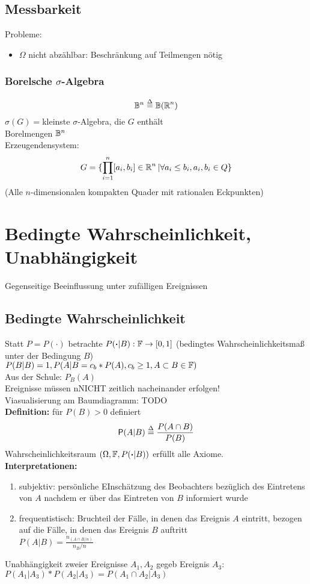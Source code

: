 \documentclass[german]{latex4ei/latex4ei_sheet}
\begin{document}
\subsection{Messbarkeit}
Probleme:
\begin{itemize}
	\item $\Omega$ nicht abz\"ahlbar: Beschr\"ankung auf Teilmengen n\"otig
\end{itemize}
\subsubsection{Borelsche $\sigma$-Algebra}
\[\B^n \overset{\Delta}{=} \B(\R^n)\]
$\sigma(G)=$kleinste $\sigma$-Algebra, die $G$ enth\"alt\\
Borelmengen $\B^n$\\
Erzeugendensystem:\\
\[G=\{\prod_{i=1}^n [a_i,b_i] \in \R^n | \forall a_i\le b_i , a_i,b_i \in Q\}\]
(Alle $n$-dimensionalen kompakten Quader mit rationalen Eckpunkten)
\section{Bedingte Wahrscheinlichkeit, Unabh\"angigkeit}
Gegenseitige Beeinflussung unter zuf\"alligen Ereignissen
\subsection{Bedingte Wahrscheinlichkeit}
Statt $P=P(\boldsymbol{\cdot})$ betrachte $P(\boldsymbol{\cdot}|B): \F \to [0,1]$ (bedingtes Wahrscheinlichkeitsma\ss{} unter der Bedingung $B$)\\
$P(B|B)=1, P(A|B=c_b*P(A), c_b\ge 1, A \subset B \in \F)$\\
Aus der Schule: $P_B(A)$\\
Ereignisse m\"ussen nNICHT zeitlich nacheinander erfolgen!\\
Viasualisierung am Baumdiagramm: TODO\\
\textbf{Definition:} f\"ur $P(B)>0$ definiert\\
\[\P(A|B)\overset{\Delta}{=}\frac{P(A \cap B)}{P(B)}\]
Wahrscheinlichkeitsraum $(\Omega, \F, P(\boldsymbol{\cdot}| B))$ erf\"ullt alle Axiome.\\
\textbf{Interpretationen:}
\begin{enumerate}
	\item subjektiv: pers\"onliche EInsch\"atzung des Beobachters bez\"uglich des Eintretens von $A$ nachdem er \"uber das Eintreten von $B$ informiert wurde
	\item frequentistisch: Bruchteil der F\"alle, in denen das Ereignis $A$ eintritt, bezogen auf die F\"alle, in denen das Ereignis $B$ auftritt\\
		$P(A|B)=\frac{n_{(A\cap B/n)}}{n_B/n}$
\end{enumerate}
Unabh\"angigkeit zweier Ereignisse $A_1,A_2$ gegeb Ereignis $A_3$: $P(A_1|A_3)*P(A_2|A_3)=P(A_1 \cap A_2 | A_3)$
\end{document}
